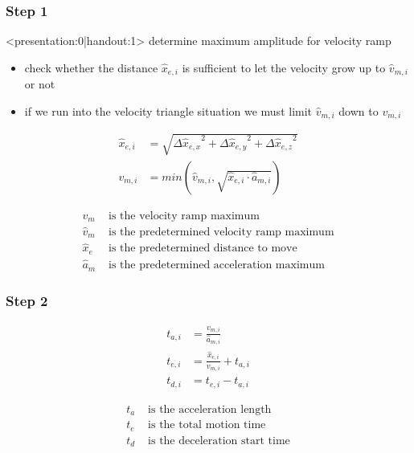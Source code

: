 \documentclass[%
  professionalfonts,%
  xcolor={%
    usenames,%
    dvipsnames,%
    svgnames,%
    table,%
    hyperref%
  }%
]{beamer}
\begin{document}
\subsubsection{Step 1}
\begin{frame}<presentation:0|handout:1>
determine maximum amplitude for velocity ramp
\begin{itemize}
\item check whether the distance $\hat{x}_{e,i}$ is sufficient to let the velocity grow up to $\hat{v}_{m,i}$ or not
\item if we run into the velocity triangle situation we must limit $\hat{v}_{m,i}$ down to $v_{m,i}$
\end{itemize}
\end{frame}

\begin{frame}
\begin{align}
\hat{x}_{e,i} & = \sqrt{{\Delta\hat{x}_{e,x}}^{2} + {\Delta\hat{x}_{e,y}}^{2} + {\Delta\hat{x}_{e,z}}^{2} } \\
v_{m,i } & = min(\hat{v}_{m,i},\sqrt{\hat{x}_{e,i} \cdot \hat{a}_{m,i}})  \label{eq:asynvmi}
\end{align}

\begin{align*}
v_{m} & \text{ is the velocity ramp maximum} \\
\hat{v}_{m} & \text{ is the predetermined velocity ramp maximum} \\
\hat{x}_{e} & \text{ is the predetermined distance to move} \\
\hat{a}_{m} & \text{ is the predetermined acceleration maximum} 
\end{align*}
\end{frame}

\subsubsection{Step 2}

\begin{frame}
\begin{align}
t_{a,i} & = \frac{v_{m,i}}{\hat{a}_{m,i}} \\
t_{e,i} & = \frac{\hat{x}_{e,i}}{v_{m,i}} + t_{a,i} \\
t_{d,i} & = t_{e,i} - t_{a,i}
\end{align}

\begin{align*}
t_{a} & \text{ is the acceleration length} \\
t_{e} & \text{ is the total motion time} \\
t_{d} & \text{ is the deceleration start time}
\end{align*}
\end{frame}
  
\end{document}
